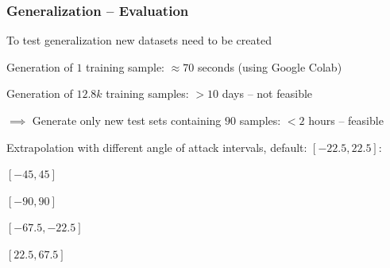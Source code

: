 \begin{frame}
    \frametitle{Generalization -- Evaluation}
    \vspace*{0.8cm}
To test generalization new datasets need to be created

Generation of $1$ training sample:  $\approx 70$ seconds (using Google Colab)

Generation of $12.8k$ training samples: $> 10$ days -- not feasible 

$\implies$ Generate only new test sets containing $90$ samples: $< 2$ hours -- feasible

Extrapolation with different angle of attack intervals, default: $[-22.5, 22.5]$:

\begin{PraesentationAufzaehlung}
    \item $[-45, 45]$
    \item $[-90, 90]$
    \item $[-67.5, -22.5]$
    \item $[22.5, 67.5]$
\end{PraesentationAufzaehlung}


\end{frame}
\clearpage

